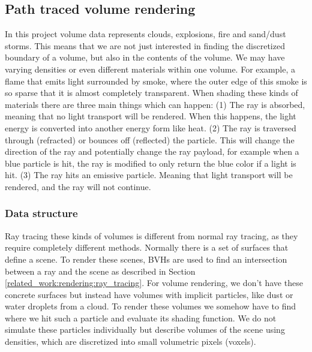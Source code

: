 \subsection{Path traced volume rendering} \label{related_work:path_traced_volume_rendering}
In this project volume data represents clouds, explosions, fire and sand/dust storms. This means that we are not just interested in finding the discretized boundary of a volume, but also in the contents of the volume. We may have varying densities or even different materials within one volume. For example, a flame that emits light surrounded by smoke, where the outer edge of this smoke is so sparse that it is almost completely transparent. When shading these kinds of materials there are three main things which can happen: (1) The ray is absorbed, meaning that no light transport will be rendered. When this happens, the light energy is converted into another energy form like heat. (2) The ray is traversed through (refracted) or bounces off (reflected) the particle. This will change the direction of the ray and potentially change the ray payload, for example when a blue particle is hit, the ray is modified to only return the blue color if a light is hit. (3) The ray hits an emissive particle. Meaning that light transport will be rendered, and the ray will not continue.

\subsubsection{Data structure} \label{related_work:path_traced_volume_rendering:data_structure}
Ray tracing these kinds of volumes is different from normal ray tracing, as they require completely different methods. Normally there is a set of surfaces that define a scene. To render these scenes, BVHs are used to find an intersection between a ray and the scene as described in Section \ref{related_work:rendering:ray_tracing}. For volume rendering, we don't have these concrete surfaces but instead have volumes with implicit particles, like dust or water droplets from a cloud. To render these volumes we somehow have to find where we hit such a particle and evaluate its shading function. We do not simulate these particles individually but describe volumes of the scene using densities, which are discretized into small volumetric pixels (voxels).

